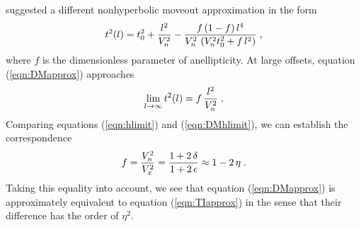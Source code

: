 \par
\cite{Muir.sep.44.55} suggested a different nonhyperbolic moveout
approximation in the form
\begin{equation}
t^2(l) = 
t_0^2 + {l^2 \over V_n^2} - {{f\,(1-f)\,l^4} \over 
{V_n^2\,\left(V_n^2 t_0^2 + f\,l^2\right)}}\;,
\label{eqn:DMapprox}
\end{equation}
where $f$ is the dimensionless parameter of anellipticity. At large
offsets, equation (\ref{eqn:DMapprox}) approaches
\begin{equation}
\lim_{l \rightarrow \infty} t^2(l) = f\,{l^2 \over V_n^2}\;.
\label{eqn:DMhlimit}
\end{equation}
Comparing equations (\ref{eqn:hlimit}) and (\ref{eqn:DMhlimit}), we
can establish the correspondence
\begin{equation}
f = {{V_n^2} \over {V_x^2}} = {{1 + 2\,\delta} \over {1 +
2\,\epsilon}} \approx 1 - 2\,\eta\;.
\label{eqn:f2eta}
\end{equation}
Taking this equality into account, we see that equation
(\ref{eqn:DMapprox}) is approximately equivalent to equation
(\ref{eqn:TIapprox}) in the sense that their difference has the order
of $\eta^2$.

